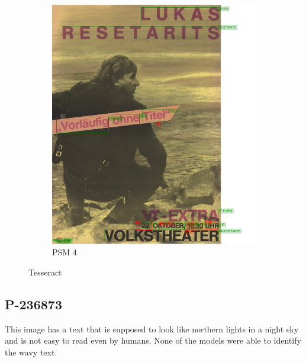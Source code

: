 \begin{figure}[hbtp!]
    \begin{subfigure}{0.45\textwidth}
        \includegraphics[scale=0.29]{obrazky/plakaty/result_tesseract_vienna2_split_psm4-83.png}
        \caption{PSM 4}
        \label{Im4:ex:tess4}
    \end{subfigure}

    \caption{Tesseract}
    \label{Im3:ex:tess}
\end{figure}

\subsection*{P-236873}

This image has a text that is supposed to look like northern lights in a night sky and is not easy to read even by humans. None of the models were able to identify the wavy text.

